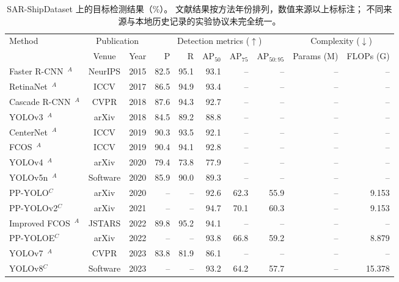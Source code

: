 \begin{table}[!t]
\centering
\small
\setlength{\tabcolsep}{3pt}
\renewcommand{\arraystretch}{1.10}
\caption{SAR-ShipDataset 上的目标检测结果（\%）。
文献结果按方法年份排列，数值来源以上标标注；
不同来源与本地历史记录的实验协议未完全统一。}
\label{tab:sarship_detection_comparison}
\begin{tabular*}{\textwidth}{@{\extracolsep{\fill}}lccrrrrrrr}
\toprule
\multirow{2}{*}{Method}
& \multicolumn{2}{c}{Publication}
& \multicolumn{5}{c}{Detection metrics ($\uparrow$)}
& \multicolumn{2}{c}{Complexity ($\downarrow$)} \\
\cmidrule(lr){2-3}
\cmidrule(lr){4-8}
\cmidrule(lr){9-10}
& Venue & Year
& P & R & AP$_{50}$ & AP$_{75}$ & AP$_{50:95}$
& Params (M) & FLOPs (G) \\
\midrule
Faster R-CNN~\cite{fasterrcnn2015}$^{A}$
& NeurIPS & 2015
& 82.5 & 95.1 & 93.1 & -- & -- & -- & -- \\
RetinaNet~\cite{retinanet2017}$^{A}$
& ICCV & 2017
& 86.5 & 94.9 & 93.4 & -- & -- & -- & -- \\
Cascade R-CNN~\cite{cascadercnn2018}$^{A}$
& CVPR & 2018
& 87.6 & 94.3 & 92.7 & -- & -- & -- & -- \\
YOLOv3~\cite{yolov32018}$^{A}$
& arXiv & 2018
& 84.5 & 89.2 & 88.8 & -- & -- & -- & -- \\
CenterNet~\cite{centernet2019}$^{A}$
& ICCV & 2019
& 90.3 & 93.5 & 92.1 & -- & -- & -- & -- \\
FCOS~\cite{fcos2019}$^{A}$
& ICCV & 2019
& 90.4 & 94.1 & 92.8 & -- & -- & -- & -- \\
YOLOv4~\cite{yolov42020}$^{A}$
& arXiv & 2020
& 79.4 & 73.8 & 77.9 & -- & -- & -- & -- \\
YOLOv5n~\cite{yolov52020}$^{A}$
& Software & 2020
& 85.9 & 90.0 & 89.3 & -- & -- & -- & -- \\
PP-YOLO$^{C}$
& arXiv & 2020
& -- & -- & 92.6 & 62.3 & 55.9 & -- & 9.153 \\
PP-YOLOv2$^{C}$
& arXiv & 2021
& -- & -- & 94.7 & 70.1 & 60.3 & -- & 9.153 \\
Improved FCOS~\cite{improvedfcos2022}$^{A}$
& JSTARS & 2022
& 89.8 & 95.2 & 94.1 & -- & -- & -- & -- \\
PP-YOLOE$^{C}$
& arXiv & 2022
& -- & -- & 93.8 & 66.8 & 59.2 & -- & 8.879 \\
YOLOv7~\cite{yolov72023}$^{A}$
& CVPR & 2023
& 83.8 & 81.9 & 86.1 & -- & -- & -- & -- \\
YOLOv8$^{C}$
& Software & 2023
& -- & -- & 93.2 & 64.2 & 57.7 & -- & 15.378 \\

\end{tabular*}
\end{table}
